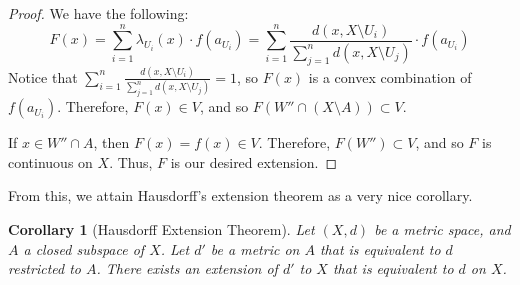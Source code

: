 \documentclass[openany, amssymb, psamsfonts]{amsart}
\newtheorem{cor}{Corollary}[section]
\theoremstyle{definition}
\numberwithin{equation}{section}
\begin{document}
\begin{proof}
  We have the following:
  \[
    F(x) = \sum_{i=1}^n \lambda_{U_i}(x) \cdot f(a_{U_i}) = \displaystyle\sum_{i=1}^{n} \displaystyle\frac{d(x, X \setminus U_i)}{\sum_{j=1}^{n}d(x, X\setminus U_j)} \cdot f(a_{U_i})
  \]
  Notice that $ \displaystyle\sum_{i=1}^{n} \displaystyle\frac{d(x, X \setminus U_i)}{\sum_{j=1}^{n}d(x, X\setminus U_j)} = 1$, so $F(x)$ is a convex combination of $f(a_{U_i})$. Therefore, $F(x) \in V$, and so $F(W''\cap (X\setminus A)) \subset V$. 

  If $x \in W'' \cap A$, then $F(x) = f(x) \in V$. Therefore, $F(W'') \subset V$, and so $F$ is continuous on $X$. Thus, $F$ is our desired extension.
\end{proof}

From this, we attain Hausdorff's extension theorem as a very nice corollary. 
\begin{cor}[Hausdorff Extension Theorem] \label{cor:3.28}
  Let $(X,d)$ be a metric space, and $A$ a closed subspace of $X$. Let $d'$ be a metric on $A$ that is equivalent to $d$ restricted to $A$. There exists an extension of $d'$ to $X$ that is equivalent to $d$ on $X$.
\end{cor}
\end{document}
